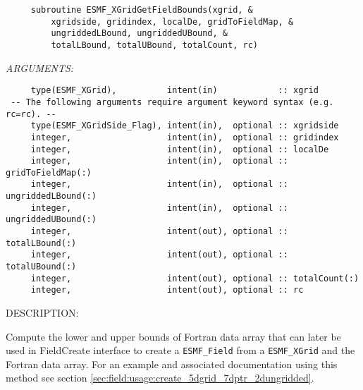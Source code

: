  
\begin{verbatim}     subroutine ESMF_XGridGetFieldBounds(xgrid, &
         xgridside, gridindex, localDe, gridToFieldMap, &
         ungriddedLBound, ungriddedUBound, &
         totalLBound, totalUBound, totalCount, rc)
     \end{verbatim}{\em ARGUMENTS:}
\begin{verbatim}     type(ESMF_XGrid),          intent(in)            :: xgrid
 -- The following arguments require argument keyword syntax (e.g. rc=rc). --
     type(ESMF_XGridSide_Flag), intent(in),  optional :: xgridside
     integer,                   intent(in),  optional :: gridindex
     integer,                   intent(in),  optional :: localDe
     integer,                   intent(in),  optional :: gridToFieldMap(:)    
     integer,                   intent(in),  optional :: ungriddedLBound(:)
     integer,                   intent(in),  optional :: ungriddedUBound(:)
     integer,                   intent(out), optional :: totalLBound(:)
     integer,                   intent(out), optional :: totalUBound(:)
     integer,                   intent(out), optional :: totalCount(:)
     integer,                   intent(out), optional :: rc     
 \end{verbatim}
{\sf DESCRIPTION:\\ }


   Compute the lower and upper bounds of Fortran data array that can later
   be used in FieldCreate interface to create a {\tt ESMF\_Field} from a
   {\tt ESMF\_XGrid} and the Fortran data array.  For an example and
   associated documentation using this method see section 
   \ref{sec:field:usage:create_5dgrid_7dptr_2dungridded}.
  
